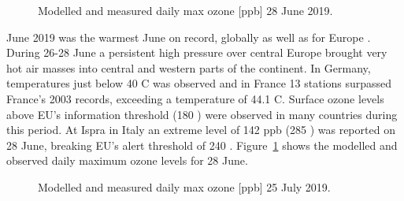 \begin{figure}[H]
\caption{Modelled and measured daily max ozone [ppb] 28 June 2019.}
\label{fig:O3_20190628}
\end{figure}

June 2019 was the warmest June on record, globally as well as for Europe \citep{Bissolli:2020}. During 26-28 June a persistent high pressure over central Europe brought very hot air masses into central and western parts of the continent. In Germany, temperatures just below 40 \degrees C was observed and in France 13 stations surpassed France’s 2003 records, exceeding a temperature of 44.1 \degrees C. Surface ozone levels above EU's information threshold (180 \ug) were observed in many countries during this period. At Ispra in Italy an extreme level of 142 ppb (285 \ug) was reported on 28 June, breaking EU's alert threshold of 240 \ug. Figure~\ref{fig:O3_20190628} shows the modelled and observed daily maximum ozone levels for 28 June. 

\begin{figure}[H]
\caption{Modelled and measured daily max ozone [ppb] 25 July 2019.}
\label{fig:O3_20190725}
\end{figure}

